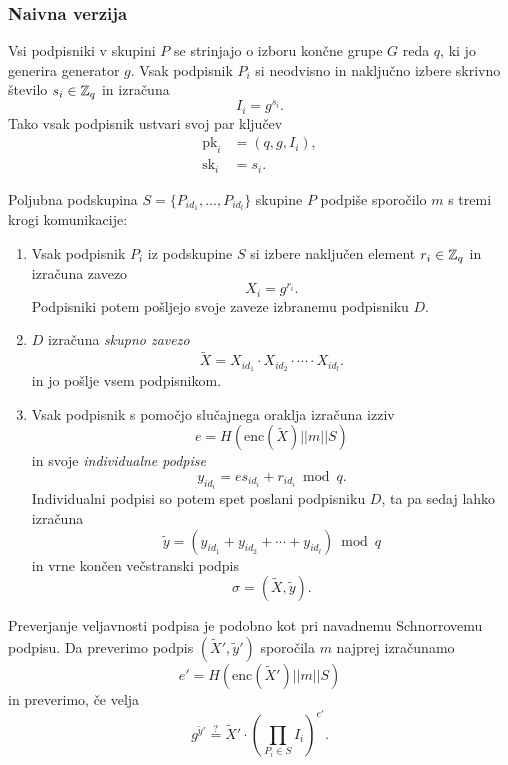 \subsubsection{Naivna verzija}
Vsi podpisniki v skupini $P$ se strinjajo o izboru končne grupe $G$ reda $q$, ki jo generira generator
$g$. Vsak podpisnik $P_i$ si neodvisno in naključno izbere skrivno število $s_i \in \mathbb Z_q$ in izračuna 
$$
I_i = g^{s_i}.
$$
Tako vsak podpisnik ustvari svoj par ključev
\begin{align*}
    \text{pk}_i &= (q, g, I_i), \\
    \text{sk}_i &= s_i.
\end{align*}

Poljubna podskupina $S =\{P_{id_1}, \dots, P_{id_l}\}$ skupine $P$ podpiše sporočilo $m$ s tremi 
krogi komunikacije:
\begin{enumerate}
    \item Vsak podpisnik $P_i$ iz podskupine $S$ si izbere naključen element $r_i \in \mathbb Z_q$
        in izračuna zavezo
        $$
        X_i = g^{r_i}.
        $$
        Podpisniki potem pošljejo svoje zaveze izbranemu podpisniku $D$. 
    \item $D$ izračuna \textit{skupno zavezo} 
        $$ 
        \tilde{X} = X_{id_1} \cdot X_{id_2} \cdot \cdots \cdot X_{id_l}.
        $$
        in jo pošlje vsem podpisnikom.
    \item Vsak podpisnik s pomočjo slučajnega oraklja izračuna izziv 
        $$ 
        e = H(\text{enc}(\tilde{X}) || m || S)
        $$
        in svoje \textit{individualne podpise} 
        $$ 
        y_{id_i} = e s_{id_i} + r_{id_i} \bmod q.
        $$
        Individualni podpisi so potem spet poslani podpisniku $D$, ta pa sedaj lahko 
        izračuna 
        $$ 
        \tilde{y} = (y_{id_1} + y_{id_2} + \cdots + y_{id_l}) \bmod q 
        $$
        in vrne končen večstranski podpis
        $$ 
        \sigma = (\tilde{X}, \tilde{y}).
        $$
\end{enumerate}

Preverjanje veljavnosti podpisa je podobno kot pri navadnemu Schnorrovemu podpisu. Da preverimo 
podpis $(\tilde{X}', \tilde{y}')$ sporočila $m$ najprej izračunamo 
$$
e' = H(\text{enc}(\tilde{X}') || m || S)
$$
in preverimo, če velja
\begin{equation}
\label{eq:naive-ver}
g^{\tilde{y}'} \stackrel{?}{=} \tilde{X}' \cdot \left(\prod_{P_i \in S} I_i \right)^{e'}.
\end{equation}

